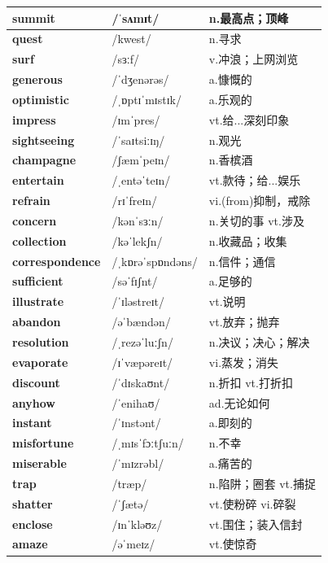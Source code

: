 \documentclass[14pt,a4paper]{extarticle}
\begin{document}
\begin{longtable}{ p{} p{} p{} }
\textbf{summit} & /ˈsʌmɪt/ & n.最高点；顶峰 \\ \hline
\textbf{quest} & /kwest/ & n.寻求 \\ \hline
\textbf{surf} & /sɜːf/ & v.冲浪；上网浏览 \\ \hline
\textbf{generous} & /ˈdʒenərəs/ & a.慷慨的 \\ \hline
\textbf{optimistic} & /ˌɒptɪˈmɪstɪk/ & a.乐观的 \\ \hline
\textbf{impress} & /ɪmˈpres/ & vt.给...深刻印象 \\ \hline
\textbf{sightseeing} & /ˈsaɪtsiːɪŋ/ & n.观光 \\ \hline
\textbf{champagne} & /ʃæmˈpeɪn/ & n.香槟酒 \\ \hline
\textbf{entertain} & /ˌentəˈteɪn/ & vt.款待；给...娱乐 \\ \hline
\textbf{refrain} & /rɪˈfreɪn/ & vi.(from)抑制，戒除 \\ \hline
\textbf{concern} & /kənˈsɜːn/ & n.关切的事 \quad vt.涉及 \\ \hline
\textbf{collection} & /kəˈlekʃn/ & n.收藏品；收集 \\ \hline
\textbf{correspondence} & /ˌkɒrəˈspɒndəns/ & n.信件；通信 \\ \hline
\textbf{sufficient} & /səˈfɪʃnt/ & a.足够的 \\ \hline
\textbf{illustrate} & /ˈɪləstreɪt/ & vt.说明 \\ \hline
\textbf{abandon} & /əˈbændən/ & vt.放弃；抛弃 \\ \hline
\textbf{resolution} & /ˌrezəˈluːʃn/ & n.决议；决心；解决 \\ \hline
\textbf{evaporate} & /ɪˈvæpəreɪt/ & vi.蒸发；消失 \\ \hline
\textbf{discount} & /ˈdɪskaʊnt/ & n.折扣 \quad vt.打折扣 \\ \hline
\textbf{anyhow} & /ˈenihaʊ/ & ad.无论如何 \\ \hline
\textbf{instant} & /ˈɪnstənt/ & a.即刻的 \\ \hline
\textbf{misfortune} & /ˌmɪsˈfɔːtʃuːn/ & n.不幸 \\ \hline
\textbf{miserable} & /ˈmɪzrəbl/ & a.痛苦的 \\ \hline
\textbf{trap} & /træp/ & n.陷阱；圈套 \quad vt.捕捉 \\ \hline
\textbf{shatter} & /ˈʃætə/ & vt.使粉碎 \quad vi.碎裂 \\ \hline
\textbf{enclose} & /ɪnˈkləʊz/ & vt.围住；装入信封 \\ \hline
\textbf{amaze} & /əˈmeɪz/ & vt.使惊奇 \\ \hline

\end{longtable}
\end{document}
